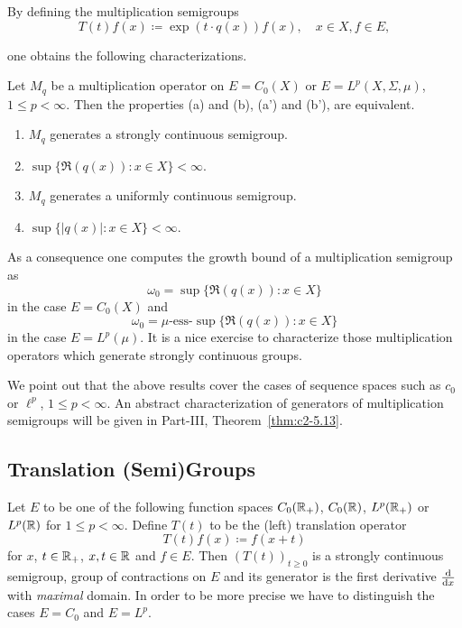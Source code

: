 By defining the multiplication semigroups
\[
    T(t)f(x) \coloneq \exp(t \cdot q(x))f(x), \quad x \in X, f \in E,
\]

one obtains the following characterizations.
\begin{proposition*}\label{prop:a1-2.3}
Let $M_{q}$ be a multiplication operator on $E = C_{0}(X)$ or $E = L^{p}(X,\Sigma,\mu)$, $1 \leq p < \infty$.
Then the properties \upshape(a) and \upshape(b), \resp \upshape(a') and \upshape(b'), are equivalent.
\begin{enumerate}[labelwidth=2em, labelsep=0.5em, leftmargin=3em, align=left]
\item[\upshape (a)] 
	$M_{q}$ generates a strongly continuous semigroup.

\item[\upshape (b)]
	$\sup\{\Re(q(x)) \colon x \in X \} < \infty$.

\item[\upshape(a')] 
	$M_{q}$ generates a uniformly continuous semigroup.

\item[\upshape(b')] 
	$\sup\{|q(x)| \colon x \in X \} < \infty$.
\end{enumerate}
\end{proposition*}
As a consequence one computes the growth bound of a multiplication semigroup as
\[
    \omega_{0} = \sup\{\Re(q(x)) \colon x \in X\} 
\]
in the case $E = C_{0}(X)$ and 
\[
    \omega_{0} = \mu\text{-ess-}\sup\{\Re(q(x)) \colon x \in X\} 
\]
in the case  $E = L^{p}(\mu)$.
It is a nice exercise to characterize those multiplication operators which generate strongly continuous groups.

We point out that the above results cover the cases of sequence spaces such as $c_{0}$ or $\ell^{p}$, $1 \leq p < \infty$.
An abstract characterization of generators of multiplication semigroups will be given in Part-III, Theorem~\ref{thm:c2-5.13}.
\subsection{Translation (Semi)Groups}\label{subsec:a1-2.4}%
Let $E$ to be one of the following function spaces $C_{0}(\mathbb{R}_{+})$, $C_{0}(\mathbb{R})$, $L^{p}(\mathbb{R}_{+})$ or $L^{p}(\mathbb{R})$ for $1 \leq p < \infty$.
Define $T(t)$ to be the (left) translation operator
\[
    T(t)f(x) \coloneq f(x+t)
\]
for $x$, $ t \in \mathbb{R}_{+}$, \resp $x, t \in \mathbb{R}$ and $f \in E$.
Then $(T(t))_{t \geq 0}$ is a strongly continuous semigroup, \resp group of contractions on $E$ and its generator is the first derivative $\frac{\mathop{}\!\mathrm{d}{}}{\mathop{}\!\mathrm{d}{x}}$ with \emph{maximal} domain.
In order to be more precise we have to distinguish the cases $E = C_{0}$ and $E = L^{p}$.

